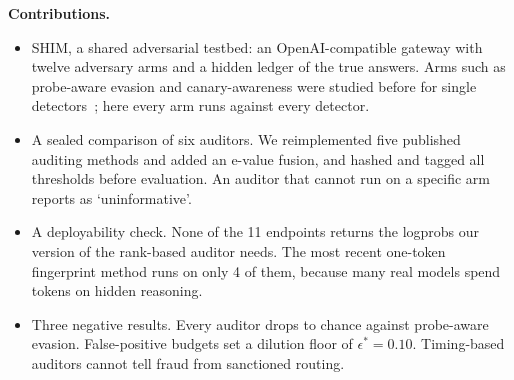 \textbf{Contributions.}
\begin{itemize}
\item SHIM, a shared adversarial testbed: an OpenAI-compatible gateway with twelve
  adversary arms and a hidden ledger of the true answers. Arms such as probe-aware
  evasion and canary-awareness were studied before for single detectors~\cite{cai2025,iris2026};
  here every arm runs against every detector.
\item A sealed comparison of six auditors. We reimplemented five published
  auditing methods and added an e-value fusion, and hashed and tagged all thresholds before
  evaluation. An auditor that cannot run on a specific arm reports as
  `uninformative'.
\item A deployability check. None of the 11 endpoints returns the logprobs our version of
  the rank-based auditor needs. The most recent one-token fingerprint method
  runs on only 4 of them, because many real models spend tokens on hidden reasoning.
\item Three negative results. Every auditor drops to chance against probe-aware
  evasion. False-positive budgets set a dilution floor of $\epsilon^* = 0.10$. Timing-based auditors
  cannot tell fraud from sanctioned routing.
\end{itemize}
